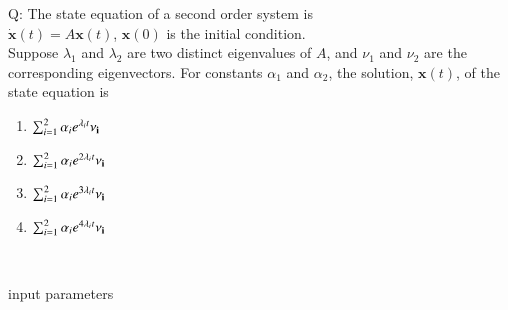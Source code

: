\documentclass[journal,12pt,onecolumn]{IEEEtran}
\theoremstyle{remark}
\begin{document}
\let\vec\mathbf







\bigskip


Q: The state equation of a second order system is \\
$ \dot{\bm{x}}(t) = A\bm{x}(t)$, \quad $\bm{x}(0)$ is the initial condition. \\
Suppose $\lambda_1$ and $\lambda_2$ are two distinct eigenvalues of $A$, and $\nu_1$ and $\nu_2$ are the corresponding eigenvectors. For constants $\alpha_1$ and $\alpha_2$, the solution, $\bm{x}(t)$, of the state equation is \\
\begin{enumerate}[label=(\Alph*)]
\item $\sum_{i=1}^{2} \alpha_ie^{\lambda_it}\bf{\nu}_i$
\item $\sum_{i=1}^{2} \alpha_ie^{2\lambda_it}\bf{\nu}_i$
\item $\sum_{i=1}^{2} \alpha_ie^{3\lambda_it}\bf{\nu}_i$
\item $\sum_{i=1}^{2} \alpha_ie^{4\lambda_it}\bf{\nu}_i$
\end{enumerate}


\solution \\
\begin{table}[!ht]
    \centering
        
    \caption{input parameters}
    \label{tab:gate23EC43.1}
\end{table}
\end{document}
